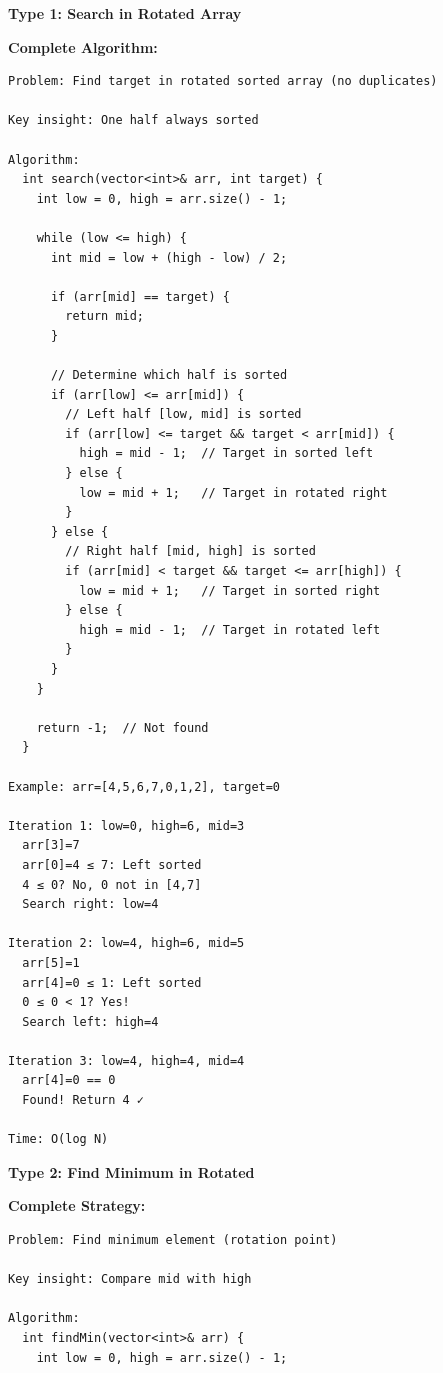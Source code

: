 \documentclass[11pt,a4paper,oneside]{book}
\begin{document}
\begin{tcolorbox}[
    enhanced,breakable,
    colback=successgreen!10,
    colframe=successgreen,
    boxrule=1.5pt,
    arc=3mm,
    title=\textbf{Complete Rotated Array Algorithms}
]
\textbf{Type 1: Search in Rotated Array}

\textbf{Complete Algorithm:}
\begin{verbatim}
Problem: Find target in rotated sorted array (no duplicates)

Key insight: One half always sorted

Algorithm:
  int search(vector<int>& arr, int target) {
    int low = 0, high = arr.size() - 1;
    
    while (low <= high) {
      int mid = low + (high - low) / 2;
      
      if (arr[mid] == target) {
        return mid;
      }
      
      // Determine which half is sorted
      if (arr[low] <= arr[mid]) {
        // Left half [low, mid] is sorted
        if (arr[low] <= target && target < arr[mid]) {
          high = mid - 1;  // Target in sorted left
        } else {
          low = mid + 1;   // Target in rotated right
        }
      } else {
        // Right half [mid, high] is sorted
        if (arr[mid] < target && target <= arr[high]) {
          low = mid + 1;   // Target in sorted right
        } else {
          high = mid - 1;  // Target in rotated left
        }
      }
    }
    
    return -1;  // Not found
  }

Example: arr=[4,5,6,7,0,1,2], target=0

Iteration 1: low=0, high=6, mid=3
  arr[3]=7
  arr[0]=4 ≤ 7: Left sorted
  4 ≤ 0? No, 0 not in [4,7]
  Search right: low=4

Iteration 2: low=4, high=6, mid=5
  arr[5]=1
  arr[4]=0 ≤ 1: Left sorted
  0 ≤ 0 < 1? Yes!
  Search left: high=4

Iteration 3: low=4, high=4, mid=4
  arr[4]=0 == 0
  Found! Return 4 ✓

Time: O(log N)
\end{verbatim}

\textbf{Type 2: Find Minimum in Rotated}

\textbf{Complete Strategy:}
\begin{verbatim}
Problem: Find minimum element (rotation point)

Key insight: Compare mid with high

Algorithm:
  int findMin(vector<int>& arr) {
    int low = 0, high = arr.size() - 1;
    

\end{verbatim}
\end{tcolorbox}
\end{document}
